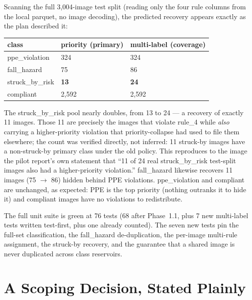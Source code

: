 Scanning the full 3{,}004-image test split (reading only the four rule columns from the local parquet,
no image decoding), the predicted recovery appears exactly as the plan described it:

\begin{center}
\begin{tabular}{p{4.4cm}p{3.6cm}p{3.6cm}}
\toprule
\textbf{class} & \textbf{priority (primary)} & \textbf{multi-label (coverage)} \\
\midrule
ppe\_violation   & 324 & 324 \\
fall\_hazard     & 75  & 86 \\
struck\_by\_risk & \textbf{13}  & \textbf{24} \\
compliant        & 2{,}592 & 2{,}592 \\
\bottomrule
\end{tabular}
\label{tab:p12-recovery}
\end{center}

The struck\_by\_risk pool nearly doubles, from 13 to 24 --- a recovery of exactly 11 images. Those 11
are precisely the images that violate rule\_4 while \emph{also} carrying a higher-priority violation
that priority-collapse had used to file them elsewhere; the count was verified directly, not inferred:
11 struck-by images have a non-struck-by primary class under the old policy. This reproduces to the
image the pilot report's own statement that ``11 of 24 real struck\_by\_risk test-split images also had
a higher-priority violation.'' fall\_hazard likewise recovers 11 images (75 $\rightarrow$ 86) hidden
behind PPE violations. ppe\_violation and compliant are unchanged, as expected: PPE is the top
priority (nothing outranks it to hide it) and compliant images have no violations to redistribute.

The full unit suite is green at 76 tests (68 after Phase~1.1, plus 7 new multi-label tests written
test-first, plus one already counted). The seven new tests pin the full-set classification, the
fall\_hazard de-duplication, the per-image multi-rule assignment, the struck-by recovery, and the
guarantee that a shared image is never duplicated across class reservoirs.

\section{A Scoping Decision, Stated Plainly}

